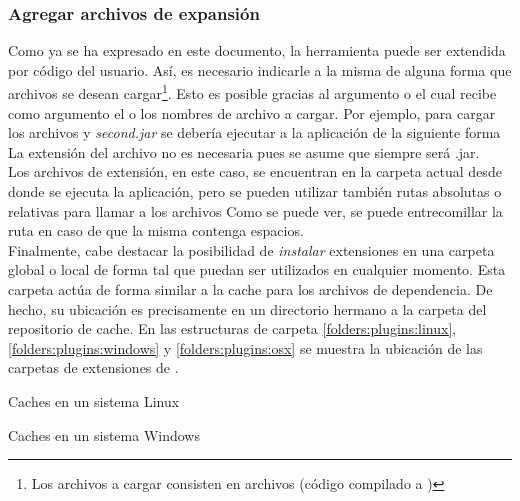 \subsubsection{Agregar archivos de expansión}
\label{subsubsec:guide:expand}

Como ya se ha expresado en este documento, la herramienta \fronttier puede ser
extendida por código del usuario. Así, es necesario indicarle a la misma de
alguna forma que archivos se desean cargar\footnote{
	Los archivos a cargar consisten en archivos \jar (código compilado a
	\bytecode \java)	
}. Esto es posible gracias al argumento  o  el cual
recibe como argumento el o los nombres de archivo a cargar. Por ejemplo, para
cargar los archivos  y \emph{second.jar} se debería ejecutar
a la aplicación de la siguiente forma
La extensión del archivo no es necesaria pues se asume que siempre será .jar.\\
Los archivos de extensión, en este caso, se encuentran en la carpeta actual
desde donde se ejecuta la aplicación, pero se pueden utilizar también rutas
absolutas o relativas para llamar a los archivos
Como se puede ver, se puede entrecomillar la ruta en caso de que la misma
contenga espacios.\\
Finalmente, cabe destacar la posibilidad de \emph{instalar} extensiones en
una carpeta global o local de forma tal que puedan ser utilizados en cualquier
momento. Esta carpeta actúa de forma similar a la cache para los archivos
de dependencia. De hecho, su ubicación es precisamente en un directorio hermano
a la carpeta del repositorio de cache. En las estructuras de carpeta
\ref{folders:plugins:linux}, \ref{folders:plugins:windows} y \ref{folders:plugins:osx}
se muestra la ubicación de las carpetas de extensiones de \fronttier.


\begin{folders}[h]
	\caption{Caches en un sistema Linux}
	\label{folders:plugins:linux}
\end{folders}

\begin{folders}[h]
	\caption{Caches en un sistema Windows}
	\label{folders:plugins:windows}
\end{folders}

